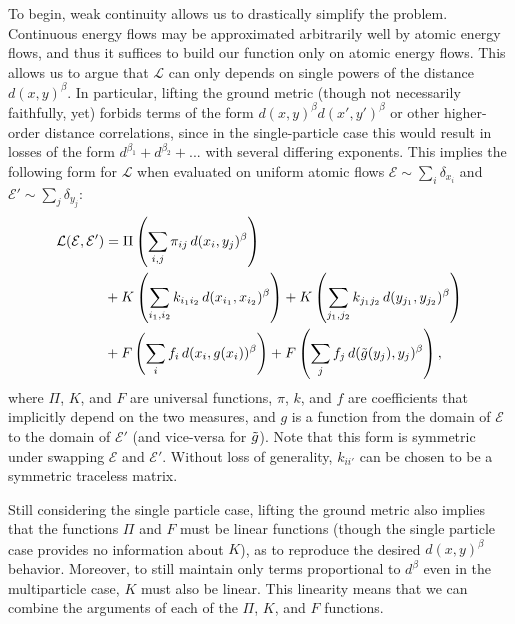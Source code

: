 \documentclass[letterpaper,11pt]{article}
\newcommand{\E}{\mathcal{E}}
\begin{document}
To begin, weak continuity allows us to drastically simplify the problem. Continuous energy flows may be approximated arbitrarily well by atomic energy flows, and thus it suffices to build our function only on atomic energy flows.
%
This allows us to argue that $\mathcal{L}$ can only depends on single powers of the distance $d(x,y)^\beta$.
%
In particular, lifting the ground metric (though not necessarily faithfully, yet) forbids terms of the form $d(x,y)^\beta d(x',y')^\beta$ or other higher-order distance correlations, since in the single-particle case this would result in losses of the form $d^{\beta_1} + d^{\beta_2} + ...$ with several differing exponents. 
%
This implies the following form for $\mathcal{L}$ when evaluated on uniform atomic flows $\E \sim \sum_i \delta_{x_i}$ and $\E' \sim \sum_j \delta_{y_j}$:
%
\begin{align}
    \mathcal{L}(\E,\E') &= \Pi\left(\sum_{i,j} \pi_{ij} \, d(x_i, y_j)^\beta \right) \nonumber \\
    & + K\left(\sum_{i_1,i_2}k_{i_1i_2} \, d(x_{i_1},x_{i_2})^\beta \right) + K\left(\sum_{j_1,j_2}k_{j_1j_2}\, d(y_{j_1},y_{j_2})^\beta \right) \nonumber\\
    & + F\left(\sum_i f_i \, d(x_i, g(x_i))^\beta\right) + F\left(\sum_j f_j \, d(\Tilde{g}(y_j), y_j)^\beta\right), \label{eq:appendix_generic_loss}
\end{align}
%
where $\Pi$, $K$, and $F$ are universal functions, $\pi$, $k$, and $f$ are coefficients that implicitly depend on the two measures, and $g$ is a function from the domain of $\E$ to the domain of $\E'$ (and vice-versa for $\Tilde{g}$). Note that this form is symmetric under swapping $\E$ and $\E'$. Without loss of generality, $k_{ii'}$ can be chosen to be a symmetric traceless matrix. 

Still considering the single particle case, lifting the ground metric also implies that the functions $\Pi$ and $F$ must be linear functions (though the single particle case provides no information about $K$), as to reproduce the desired $d(x,y)^\beta$ behavior. Moreover, to still maintain only terms proportional to $d^\beta$ even in the multiparticle case, $K$ must also be linear. This linearity means that we can combine the arguments of each of the $\Pi$, $K$, and $F$ functions.
\end{document}
